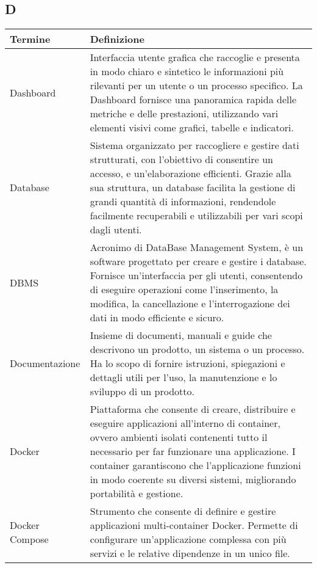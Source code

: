 \documentclass[10pt]{article}
\begin{document}
\subsection{D} %
\begin{longtable}{|>{\centering\arraybackslash}m{2.5cm}|>{\arraybackslash}m{12.5cm}|}
\hline
\rowcolor[gray]{0.8}
\textbf{Termine} & \textbf{Definizione}\\
\endhead
\hline
Dashboard & Interfaccia utente grafica che raccoglie e presenta in modo chiaro e sintetico le informazioni più rilevanti per un utente o un processo specifico. La Dashboard fornisce una panoramica rapida delle metriche e delle prestazioni, utilizzando vari elementi visivi come grafici, tabelle e indicatori.\\
\hline
Database & Sistema organizzato per raccogliere e gestire dati strutturati, con l'obiettivo di consentire un accesso, e un'elaborazione efficienti. Grazie alla sua struttura, un database facilita la gestione di grandi quantità di informazioni, rendendole facilmente recuperabili e utilizzabili per vari scopi dagli utenti.\\
\hline
DBMS & Acronimo di DataBase Management System, è un software progettato per creare e gestire i database. Fornisce un'interfaccia per gli utenti, consentendo di eseguire operazioni come l'inserimento, la modifica, la cancellazione e l'interrogazione dei dati in modo efficiente e sicuro.\\
\hline
Documentazione & Insieme di documenti, manuali e guide che descrivono un prodotto, un sistema o un processo. Ha lo scopo di fornire istruzioni, spiegazioni e dettagli utili per l'uso, la manutenzione e lo sviluppo di un prodotto.\\
\hline
Docker & Piattaforma che consente di creare, distribuire e eseguire applicazioni all'interno di container, ovvero ambienti isolati contenenti tutto il necessario per far funzionare una applicazione. I container garantiscono che l'applicazione funzioni in modo coerente su diversi sistemi, migliorando portabilità e gestione.\\
\hline
Docker Compose & Strumento che consente di definire e gestire applicazioni multi-container Docker. Permette di configurare un’applicazione complessa con più servizi e le relative dipendenze in un unico file.\\
\hline
\end{longtable}
\end{document}
